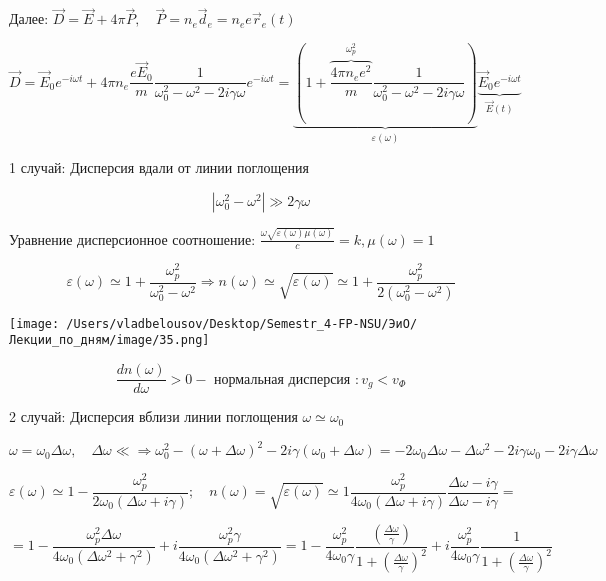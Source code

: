\documentclass[12pt, a4paper]{report}
\begin{document}
Далее: \( \displaystyle \vec{D }  = \vec{E }  +4 \pi \vec{P }  , \quad  \vec{P }  = n_e \vec{d }_e = n_e e \vec{r } _e (t ) \) 

\[ \vec{D }  = \vec{E }  _0 e^{ -i \omega t } + 4 \pi n_e \frac{e \vec{E } _0 }{m } \frac{1}{\omega_0 ^2 - \omega ^2 - 2 i \gamma \omega} e^{- i \omega t }  = \underbrace{\left(  1+ \overbrace{\frac{4 \pi n_e e ^2 } { m }}^{\omega_p ^2 } \frac{1}{\omega_0 ^2 - \omega ^2 -  2 i \gamma \omega  }\right) }_{\varepsilon ( \omega)}\underbrace{\vec{E }  _0 e^{- i \omega t }}_{\vec{E }(t ) }     \] 

1 случай: Дисперсия вдали от линии поглощения 

\[ |\omega_0 ^2 - \omega ^2 | \gg 2 \gamma \omega  \] 

Уравнение дисперсионное соотношение: \( \displaystyle \frac{\omega \sqrt{\varepsilon ( \omega )\mu ( \omega )}}{c } = k , \mu (\omega ) = 1   \) 

\[ \varepsilon (\omega ) \simeq 1+ \frac{\omega_p ^2 } { \omega_0 ^2 - \omega ^2 } \Rightarrow n ( \omega ) \simeq \sqrt{\varepsilon (\omega )} \simeq 1+ \frac{\omega_p ^2 } {2(\omega_0 ^2 - \omega ^2) }       \] 

\begin{center}
    \texttt{[image: /Users/vladbelousov/Desktop/Semestr\_4-FP-NSU/ЭиО/Лекции\_по\_дням/image/35.png]}
\end{center}

\[ \frac{dn ( \omega)}{d \omega} > 0 - \text{ нормальная дисперсия }: v_{g } < v_{\Phi }     \] 

2 случай: Дисперсия вблизи линии поглощения \( \omega \simeq \omega_0  \) 

\[ \omega = \omega_0 \Delta \omega , \quad  \Delta \omega \ll \Rightarrow \omega_0 ^2 - ( \omega+ \Delta \omega ) ^2 - 2 i \gamma ( \omega_0 + \Delta \omega ) = -2 \omega_0 \Delta \omega - \Delta \omega ^2 - 2 i \gamma \omega_0 - 2 i \gamma \Delta\omega   \] 

\[ \varepsilon ( \omega ) \simeq 1 - \frac{ \omega_p ^2 }{2 \omega_0 (\Delta \omega + i \gamma)}; \quad  n( \omega ) = \sqrt{\varepsilon( \omega)} \simeq 1 \frac{ \omega_p ^2 }{4 \omega_0 (\Delta \omega + i \gamma)} \frac{ \Delta \omega - i \gamma }{\Delta \omega - i \gamma} =     \] 

\[ =1  -\frac{\omega_p ^2 \Delta \omega}{4 \omega_0 (\Delta \omega ^2 + \gamma ^2)} + i \frac{ \omega_p ^2 \gamma }{4 \omega_0(\Delta \omega ^2 + \gamma ^2) }= 1- \frac{ \omega_p ^2 }{4 \omega_0 \gamma }\frac{ ( \frac{\Delta \omega}{\gamma} )}{1+ \left( \frac{\Delta \omega}{\gamma}  \right) ^2 } + i \frac{\omega_p ^2 }{4 \omega_0\gamma } \frac{ 1}{1+ \left( \frac{\Delta \omega}{\gamma}  \right) ^2}    \] 
\end{document}
